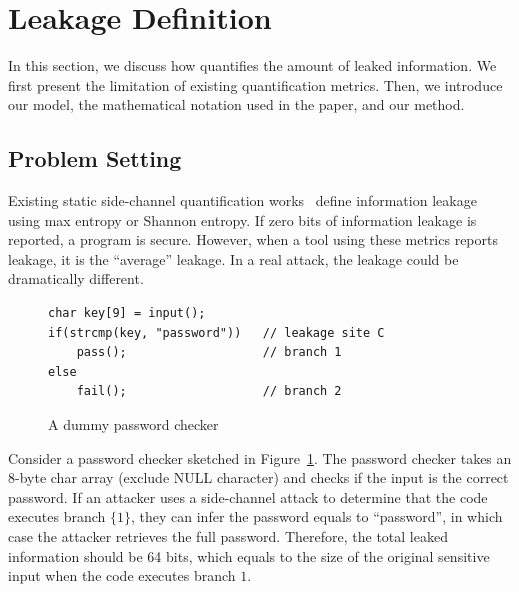 \section{Leakage Definition}

In this section, we discuss how \tool{} quantifies the amount of leaked
information. We first present the limitation of existing quantification metrics.
Then, we introduce our model, the mathematical notation used in the
paper, and our method.

\subsection{Problem Setting}
Existing static side-channel quantification
works~\cite{182946,Wichelmann:2018:MFF:3274694.3274741,zhang2010sidebuster,bang2016string} define information
leakage using max entropy or Shannon entropy.  If zero bits of
information leakage is reported, a program is secure. However, when a tool using these metrics reports leakage, it is the ``average'' leakage. In a real attack, the leakage could be dramatically different.

\begin{figure}[h!]
    \centering
    \begin{lstlisting}[xleftmargin=.2\textwidth, xrightmargin=.2\textwidth]
char key[9] = input();
if(strcmp(key, "password"))   // leakage site C
    pass();                   // branch 1
else
    fail();                   // branch 2
\end{lstlisting}
    \vspace*{-10pt}
    \caption{A dummy password checker}
    \label{fig:password-checker}
\end{figure}

Consider a password checker sketched in Figure~\ref{fig:password-checker}.
The password checker takes an 8-byte char array (exclude \textsf{NULL} character)
and checks if the input is the correct password. If an attacker uses a side-channel attack to determine that the code executes branch
$\{{1\}}$, they can infer the password equals to
``password'', in which case the attacker retrieves the full password.
Therefore, the total leaked information should be 64 bits, which equals to the
size of the original sensitive input when the code executes branch
$1$.

